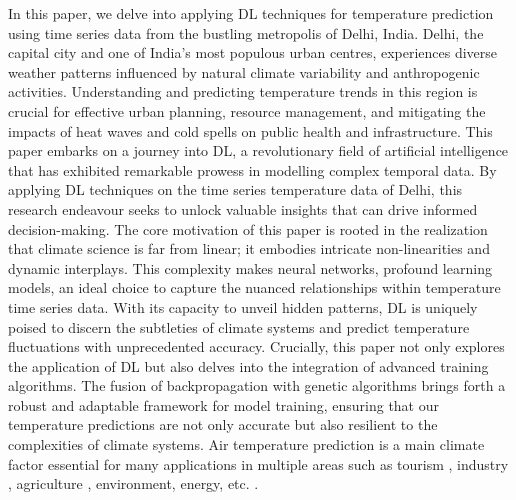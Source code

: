 \documentclass[sn-mathphys,Numbered]{sn-jnl}
\theoremstyle{thmstyleone}
\theoremstyle{thmstyletwo}
\theoremstyle{thmstylethree}
\begin{document}
In this paper, we delve into applying DL techniques for temperature prediction using time series data from the bustling metropolis of Delhi, India. Delhi, the capital city and one of India's most populous urban centres, experiences diverse weather patterns influenced by natural climate variability and anthropogenic activities. Understanding and predicting temperature trends in this region is crucial for effective urban planning, resource management, and mitigating the impacts of heat waves and cold spells on public health and infrastructure. This paper embarks on a journey into DL, a revolutionary field of artificial intelligence that has exhibited remarkable prowess in modelling complex temporal data. By applying DL techniques on the time series temperature data of Delhi, this research endeavour seeks to unlock valuable insights that can drive informed decision-making. The core motivation of this paper is rooted in the realization that climate science is far from linear; it embodies intricate non-linearities and dynamic interplays. This complexity makes neural networks, profound learning models, an ideal choice to capture the nuanced relationships within temperature time series data. With its capacity to unveil hidden patterns, DL is uniquely poised to discern the subtleties of climate systems and predict temperature fluctuations with unprecedented accuracy. Crucially, this paper not only explores the application of DL but also delves into the integration of advanced training algorithms. The fusion of backpropagation with genetic algorithms brings forth a robust and adaptable framework for model training, ensuring that our temperature predictions are not only accurate but also resilient to the complexities of climate systems. Air temperature prediction is a main climate factor essential for many applications in multiple areas such as tourism \cite{salman2015weather}, industry \cite{kumar2021opportunities}, agriculture \cite{mohan2018deep}, environment, energy, etc. \cite{abdel2004hourly}.
\end{document}
